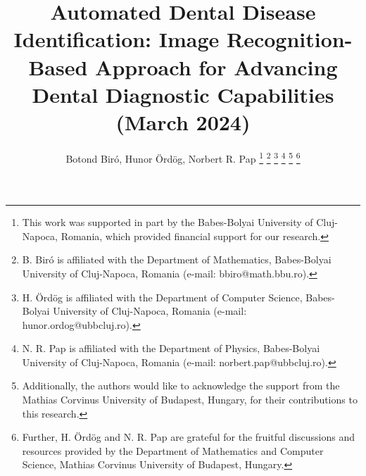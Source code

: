 \documentclass[journal,twoside,web]{ieeecolor}
\begin{document}
\title{Automated Dental Disease Identification: Image Recognition-Based Approach for Advancing Dental Diagnostic Capabilities (March 2024)}

\author{Botond Biró, Hunor Ördög, Norbert R. Pap
    \thanks{This work was supported in part by the Babes-Bolyai University of Cluj-Napoca, Romania, which provided financial support for our research.}
    \thanks{B. Biró is affiliated with the Department of Mathematics, Babes-Bolyai University of Cluj-Napoca, Romania (e-mail: bbiro@math.bbu.ro).}
    \thanks{H. Ördög is affiliated with the Department of Computer Science, Babes-Bolyai University of Cluj-Napoca, Romania (e-mail: hunor.ordog@ubbcluj.ro).}
    \thanks{N. R. Pap is affiliated with the Department of Physics, Babes-Bolyai University of Cluj-Napoca, Romania (e-mail: norbert.pap@ubbcluj.ro).}
    \thanks{Additionally, the authors would like to acknowledge the support from the Mathias Corvinus University of Budapest, Hungary, for their contributions to this research.}
    \thanks{Further, H. Ördög and N. R. Pap are grateful for the fruitful discussions and resources provided by the Department of Mathematics and Computer Science, Mathias Corvinus University of Budapest, Hungary.}
}


\maketitle
\end{document}

